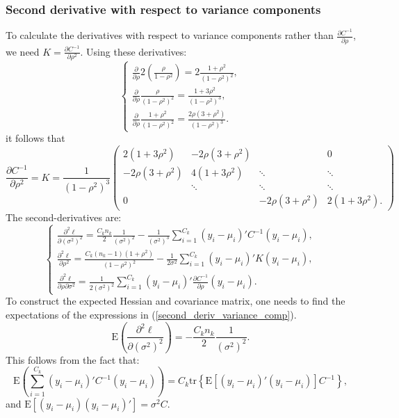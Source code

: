 \documentclass[11pt,a5paper,twoside]{book}
\begin{document}
{\subsubsection{Second derivative with respect to variance components}
To calculate the derivatives with respect to variance components rather than
$\frac{\partial C^{-1}}{\partial \rho}$, we need $K=\frac{\partial C^{-1}}{\partial \rho^2}$. Using these derivatives:
\begin{equation}
\label{useful_deriv}
\begin{cases}
\frac{\partial}{\partial \rho} 2\left(\frac{\rho}{1-\rho^2} \right)= 2\frac{1+\rho^2}{(1-\rho^2)^2},\\
\frac{\partial}{\partial \rho} \frac{\rho}{(1-\rho^2)^2}=\frac{1+3\rho^2}{(1-\rho^2)^3},\\
\frac{\partial}{\partial \rho} \frac{1+\rho^2}{(1-\rho^2)^2} = \frac{2\rho(3+\rho^2)}{(1-\rho^2)^3}.
\end{cases}
\end{equation}
it follows that
\begin{equation}
\label{K}
\frac{\partial C^{-1}}{\partial \rho^2} = K = \frac{1}{(1-\rho^2)^3}
\begin{pmatrix}
2(1+3\rho^2) & -2\rho(3+\rho^2) &   & 0\\
-2\rho(3+\rho^2) & 4(1+3\rho^2) & \ddots &  \ddots\\
 & \ddots & \ddots  & \ddots\\
 0&  &  -2\rho(3+\rho^2) & 2(1+3\rho^2).
\end{pmatrix}
\end{equation}
The second-derivatives are:
\begin{equation}
\label{second_deriv_variance_comp}
\begin{cases}
\frac{\partial^2 \ell}{\partial (\sigma^2)^2} = \frac{C_kn_k}{2}\frac{1}{(\sigma^2)^2}- \frac{1}{(\sigma^2)^3}\sum_{i=1}^{C_k} (y_i-\mu_i)' C^{-1} (y_i-\mu_i),\\
\frac{\partial^2 \ell}{\partial \rho^2} = \frac{C_k(n_k-1)(1+\rho^2)}{(1-\rho^2)^2}-\frac{1}{2\sigma^2}\sum_{i=1}^{C_k} (y_i-\mu_i)' K (y_i-\mu_i),\\
\frac{\partial^2 \ell}{\partial \rho \partial \sigma^2} =\frac{1}{2(\sigma^2)^2}\sum_{i=1}^{C_k} (y_i-\mu_i)'\frac{\partial C^{-1}}{\partial \rho} (y_i-\mu_i).
\end{cases}
\end{equation}
To construct the expected Hessian and covariance matrix, one needs to find the expectations of the expressions in (\ref{second_deriv_variance_comp}).
\begin{equation}
\label{expectation_second_deriv_seigma2}
\mathrm{E}\left(\frac{\partial^2 \ell}{\partial (\sigma^2)^2} \right)= -\frac{C_kn_k}{2}\frac{1}{(\sigma^2)^2}.
\end{equation}
This follows from the fact that: $$\mathrm{E}\left(\sum_{i=1}^ {C_k}  (y_i-\mu_i)' C^{-1} (y_i-\mu_i) \right)=C_k \mathrm{tr}\left\{\mathrm{E}\left[(y_i-\mu_i)'(y_i-\mu_i) \right ] C^{-1}\right\},$$ and $\mathrm{E}\left[(y_i-\mu_i)(y_i-\mu_i)'\right]=\sigma^2 C$.

}
\end{document}
